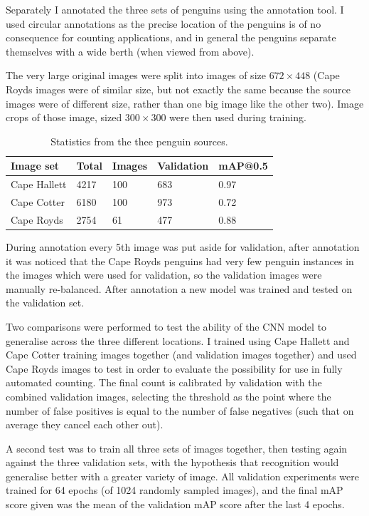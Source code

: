 Separately I annotated the three sets of penguins using the annotation tool. I used circular annotations as the precise location of the penguins is of no consequence for counting applications, and in general the penguins separate themselves with a wide berth (when viewed from above).  

The very large original images were split into images of size $ 672\times448 $ (Cape Royds images were of similar size, but not exactly the same because the source images were of different size, rather than one big image like the other two). Image crops of those image, sized $ 300\times300 $ were then used during training.

\begin{table}[ht]
  \centering
    \caption{Statistics from the thee penguin sources. }
  \begin{tabular}{ l  l  l  l  l }
    Image set & Total & Images & Validation & mAP@0.5 \\
    \toprule
    Cape Hallett  & 4217 & 100 & 683 & 0.97 \\
    Cape Cotter   & 6180 & 100 & 973 & 0.72  \\
    Cape Royds    & 2754 & 61 & 477  & 0.88 \\
    \bottomrule
  \end{tabular}
\label{fig:penguin_statistics}
\end{table}

During annotation every 5th image was put aside for validation, after annotation it was noticed that the Cape Royds penguins had very few penguin instances in the images which were used for validation, so the validation images were manually re-balanced. After annotation a new model was trained and tested on the validation set.

Two comparisons were performed to test the ability of the \gls{CNN} model to generalise across the three different locations. I trained using Cape Hallett and Cape Cotter training images together (and validation images together) and used Cape Royds images to test in order to evaluate the possibility for use in fully automated counting. The final count is calibrated by validation with the combined validation images, selecting the threshold as the point where the number of false positives is equal to the number of false negatives (such that on average they cancel each other out).

A second test was to train all three sets of images together, then testing again against the three validation sets, with the hypothesis that recognition would generalise better with a greater variety of image. All validation experiments were trained for 64 epochs (of 1024 randomly sampled images), and the final mAP score given was the mean of the validation mAP score after the last 4 epochs.

